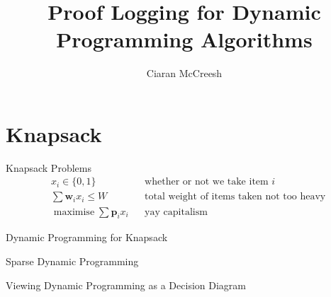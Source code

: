 \documentclass[aspectratio=169,compress,10pt]{beamer}
\author{Ciaran McCreesh}
\title{Proof Logging for Dynamic Programming Algorithms}
\begin{document}
{
    \begin{frame}
        \titlepage
    \end{frame}
}

\section{Knapsack}

\begin{frame}{Knapsack Problems}
    \begin{align*}
        &x_i \in \{0, 1\} && \text{whether or not we take item $i$}\\
        &\sum \boldsymbol{w}_i x_i \le W && \text{total weight of items taken not too heavy}\\
        &\operatorname{maximise} \sum \boldsymbol{p}_i x_i && \text{yay capitalism}
    \end{align*}
\end{frame}

\begin{frame}{Dynamic Programming for Knapsack}
\end{frame}

\begin{frame}{Sparse Dynamic Programming}
\end{frame}

\begin{frame}{Viewing Dynamic Programming as a Decision Diagram}
\end{frame}
\end{document}

